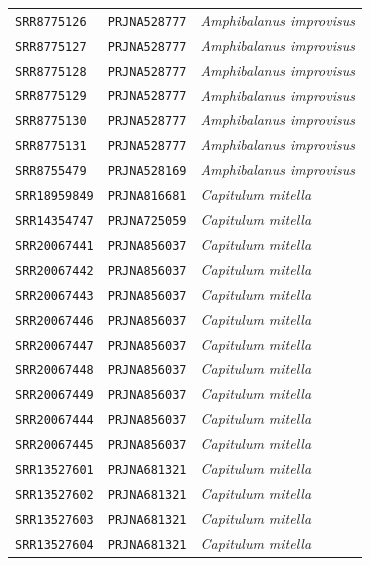 \documentclass[11pt]{article}
\begin{document}
\begin{table}[ht]
\begin{tabular}{lll}
            \texttt{SRR8775126}  & \texttt{PRJNA528777} & \textit{Amphibalanus improvisus} \\
            \texttt{SRR8775127}  & \texttt{PRJNA528777} & \textit{Amphibalanus improvisus} \\
            \texttt{SRR8775128}  & \texttt{PRJNA528777} & \textit{Amphibalanus improvisus} \\
            \texttt{SRR8775129}  & \texttt{PRJNA528777} & \textit{Amphibalanus improvisus} \\
            \texttt{SRR8775130}  & \texttt{PRJNA528777} & \textit{Amphibalanus improvisus} \\
            \texttt{SRR8775131}  & \texttt{PRJNA528777} & \textit{Amphibalanus improvisus} \\
            \texttt{SRR8755479}  & \texttt{PRJNA528169} & \textit{Amphibalanus improvisus} \\
            \texttt{SRR18959849} & \texttt{PRJNA816681} & \textit{Capitulum mitella} \\
            \texttt{SRR14354747} & \texttt{PRJNA725059} & \textit{Capitulum mitella} \\
            \texttt{SRR20067441} & \texttt{PRJNA856037} & \textit{Capitulum mitella} \\
            \texttt{SRR20067442} & \texttt{PRJNA856037} & \textit{Capitulum mitella} \\
            \texttt{SRR20067443} & \texttt{PRJNA856037} & \textit{Capitulum mitella} \\
            \texttt{SRR20067446} & \texttt{PRJNA856037} & \textit{Capitulum mitella} \\
            \texttt{SRR20067447} & \texttt{PRJNA856037} & \textit{Capitulum mitella} \\
            \texttt{SRR20067448} & \texttt{PRJNA856037} & \textit{Capitulum mitella} \\
            \texttt{SRR20067449} & \texttt{PRJNA856037} & \textit{Capitulum mitella} \\
            \texttt{SRR20067444} & \texttt{PRJNA856037} & \textit{Capitulum mitella} \\
            \texttt{SRR20067445} & \texttt{PRJNA856037} & \textit{Capitulum mitella} \\
            \texttt{SRR13527601} & \texttt{PRJNA681321} & \textit{Capitulum mitella} \\
            \texttt{SRR13527602} & \texttt{PRJNA681321} & \textit{Capitulum mitella} \\
            \texttt{SRR13527603} & \texttt{PRJNA681321} & \textit{Capitulum mitella} \\
            \texttt{SRR13527604} & \texttt{PRJNA681321} & \textit{Capitulum mitella} \\
        \bottomrule
    \end{tabular}
    \label{tab:sup_sra_data}
\end{table}
\end{document}
